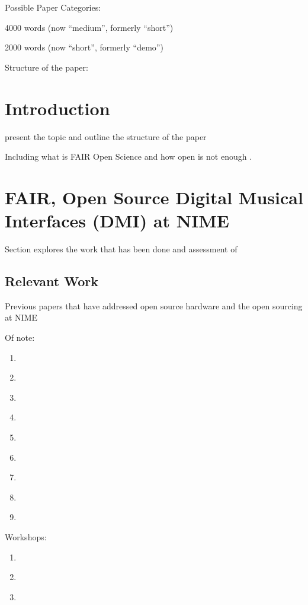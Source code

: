 
Possible Paper Categories:

4000 words (now “medium”, formerly “short”)

2000 words (now “short”, formerly “demo”)

Structure of the paper:

\section{Introduction}
present the topic and outline the structure of the paper

Including what is FAIR \citet{wilkinson_fair_2016} Open Science \citet{burgelman_open_2019} and how open is not enough \citet{chen_open_2019}.

\section{FAIR, Open Source Digital Musical Interfaces (DMI) at NIME}

Section explores the work that has been done and assessment of 

\subsection{Relevant Work}
Previous papers that have addressed open source hardware and the open sourcing at NIME

Of note:

\begin{enumerate}
    \item  \citet{fiordelmondo_towards_2025}
    \item  \citet{clarke_longevity_2025}
    \item  \citet{calegario_documentation_2021}
    \item  \citet{colazo_licence_2009}
    \item  \citet{perkel_challenge_2020}
    \item  \citet{robert_reproducibility_2020}
    \item  
    \item  \citet{bonvoisin_source_2017}
    \item  \citet{fiordelmondo_longevity_2024}    
\end{enumerate}

Workshops:
\begin{enumerate}
\item \citet{mcpherson_nimehub_2016}
\item \citet{jensenius_open_2019}
\item \citet{jensenius_nime_2020}
\end{enumerate}

